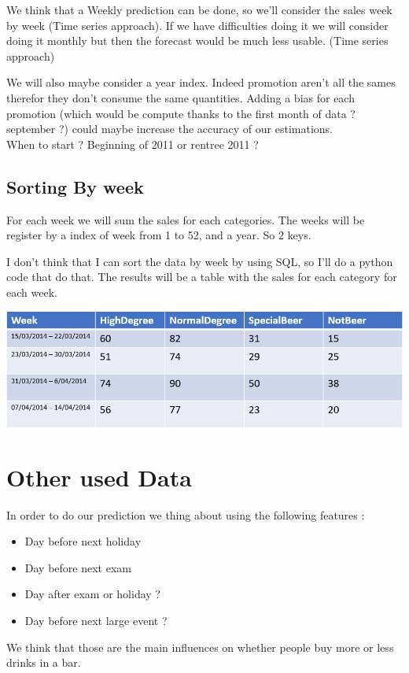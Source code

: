 \documentclass{report}
\begin{document}
We think that a Weekly prediction can be done, so we'll consider the sales week by week (Time series approach). If we have difficulties doing it we will consider doing it monthly but then the forecast would be much less usable. (Time series approach)

We will also maybe consider a year index. Indeed promotion aren't all the sames therefor they don't consume the same quantities. Adding a bias for each promotion (which would be compute thanks to the first month of data ? september ?) could maybe increase the accuracy of our estimations.\\
When to start ? Beginning of 2011 or rentree 2011 ?

\subsection{Sorting By week}

For each week we will sum the sales for each categories. The weeks will be register by a index of week from 1 to 52, and a year. So 2 keys.

I don't think that I can sort the data by week by using SQL, so I'll do a python code that do that. The results will be a table with the sales for each category for each week.


\includegraphics[scale = 0.8]{FormatTable}

\section{Other used Data}

In order to do our prediction we thing about using the following features :
\begin{itemize}
\item Day before next holiday
\item Day before next exam
\item Day after exam or holiday ?
\item Day before next large event ?
\end{itemize}

We think that those are the main influences on whether people buy more or less drinks in a bar.
\end{document}
